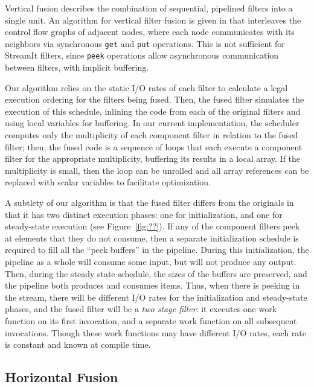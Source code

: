 Vertical fusion describes the combination of sequential, pipelined
filters into a single unit.  An algorithm for vertical filter fusion
is given in \cite{pro96} that interleaves the control flow graphs of
adjacent nodes, where each node communicates with its neighbors via
synchronous {\tt get} and {\tt put} operations.  This is not
sufficient for StreamIt filters, since {\tt peek} operations allow
asynchronous communication between filters, with implicit buffering.

Our algorithm relies on the static I/O rates of each filter to
calculate a legal execution ordering for the filters being fused.
Then, the fused filter simulates the execution of this schedule,
inlining the code from each of the original filters and using local
variables for buffering.  In our current implementation, the scheduler
computes only the multiplicity of each component filter in relation to
the fused filter; then, the fused code is a sequence of loops that
each execute a component filter for the appropriate multiplicity,
buffering its results in a local array.  If the multiplicity is small,
then the loop can be unrolled and all array references can be replaced
with scalar variables to facilitate optimization.

A subtlety of our algorithm is that the fused filter differs from the
originals in that it has two distinct execution phases: one for
initialization, and one for steady-state execution (see
Figure~\ref{fig:??}).  If any of the component filters peek at
elements that they do not consume, then a separate initialization
schedule is required to fill all the ``peek buffers'' in the pipeline.
During this initialization, the pipeline as a whole will consume some
input, but will not produce any output.  Then, during the steady state
schedule, the sizes of the buffers are preserved, and the pipeline
both produces and consumes items.  Thus, when there is peeking in the
stream, there will be different I/O rates for the initialization and
steady-state phases, and the fused filter will be a {\it two stage
filter}: it executes one work function on its first invocation, and a
separate work function on all subsequent invocations.  Though these
work functions may have different I/O rates, each rate is constant and
known at compile time.

\subsection{Horizontal Fusion}

